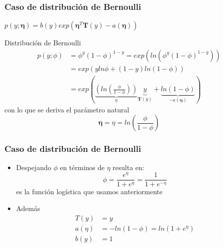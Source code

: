 \documentclass[10pt]{beamer}
\begin{document}
\begin{frame}
  \frametitle{Caso de distribución de Bernoulli}
\begin{flushright}$p(y;\boldsymbol{\eta})= b(y)exp(\boldsymbol{\eta}^T \boldsymbol{T}(y)-a(\boldsymbol{\eta})) $ \end{flushright}
Distribución de Bernoulli  
\begin{equation*}
\begin{split}
p(y;\phi)&= \phi^y (1-\phi)^{1-y}= exp(ln(\phi^y (1-\phi)^{1-y}))\\
&= exp(y ln\phi + (1-y)ln(1-\phi))\\
& = exp \left( 	 \underbrace{\left(ln  \left(  \frac{\phi}{1-\phi}\right)  \right) }_{\eta}   \underbrace{y}_{\boldsymbol{T}(y)} + \underbrace{ln(1-\phi)}_{-a(\boldsymbol{\eta})}  \right) 
\end{split}
\end{equation*}  
  con lo que se deriva  el parámetro natural
  \begin{equation*}
  \boldsymbol{\eta}= \eta=ln  \left(  \frac{\phi}{1-\phi}\right) 
  \end{equation*}
\end{frame}
\begin{frame}
  \frametitle{Caso de distribución de Bernoulli}
  \begin{itemize}
  \item Despejando $\phi$ en términos de $\eta$ resulta en:
  \begin{equation*}
  \phi= \frac{e^\eta}{1+e^\eta}= \frac{1}{1+e^{-\eta}}
  \end{equation*}
  es la función logística que usamos anteriormente
  \item Además
  \begin{align*} 
  T(y)&=y\\ 
  a(\eta)&=-ln(1-\phi)=ln(1+e^\eta)\\ 
  b(y)&=1
  \end{align*}
  
  \end{itemize}
\end{frame}
\end{document}
